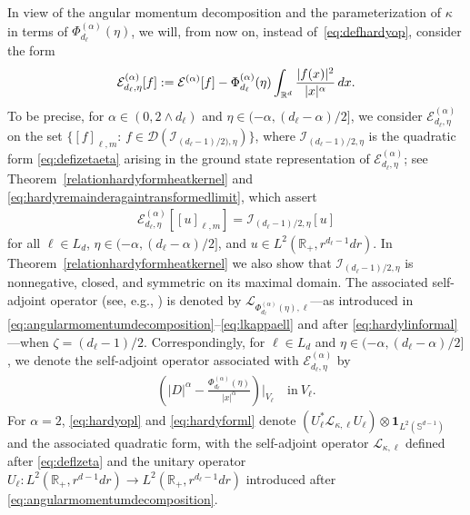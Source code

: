 \documentclass[12pt,reqno]{amsart}
\theoremstyle{definition}
\theoremstyle{remark}
\numberwithin{equation}{section}
\newcommand{\1}{\mathbbm{1}}
\newcommand{\D}{\mathcal{D}}
\newcommand{\R}{\mathbb{R}}
\def\bs{\mathbb{S}}
\def\ce{\mathcal{E}}
\def\ci{\mathcal{I}}
\def\cl{\mathcal{L}}
\newcommand{\one}{\mathbf{1}}
\begin{document}
\smallskip
In view of the angular momentum decomposition and the parameterization of $\kappa$ in terms of $\Phi_{d_\ell}^{(\alpha)}(\eta)$, we will, from now on, instead of~\eqref{eq:defhardyop}, consider the form
\begin{align}
  \label{eq:hardyforml}
  \begin{split}
    \ce_{d_\ell,\eta}^{(\alpha)}[f]\index{$\ce_{d_\ell,\eta}^{(\alpha)}$}
    := \ce^{(\alpha)}[f] - \Phi_{d_\ell}^{(\alpha)}(\eta) \int_{\R^d}\frac{|f(x)|^2}{|x|^\alpha}\,dx.
  \end{split}
\end{align}
To be precise, for $\alpha\in(0,2\wedge d_\ell)$ and $\eta\in(-\alpha,(d_\ell-\alpha)/2]$, we consider $\ce_{d_\ell,\eta}^{(\alpha)}$ on the set $\{[f]_{\ell,m}:\, f\in \D(\ci_{(d_\ell-1)/2),\eta})\}$, where $\ci_{(d_\ell-1)/2,\eta}$ is the quadratic form \eqref{eq:defizetaeta} arising in the ground state representation of $\ce_{d_\ell,\eta}^{(\alpha)}$; see Theorem~\ref{relationhardyformheatkernel} and \eqref{eq:hardyremainderagaintransformedlimit}, which assert
\begin{align}
  \label{eq:hardyl}
  \ce_{d_\ell,\eta}^{(\alpha)}[[u]_{\ell,m}] = \ci_{(d_\ell-1)/2,\eta}[u]
\end{align}
for all $\ell\in L_d$, 
$\eta\in(-\alpha,(d_\ell-\alpha)/2]$, and 
$u\in L^2(\R_+,r^{d_\ell-1}dr)$. %
In Theorem~\ref{relationhardyformheatkernel} we also show that $\ci_{(d_\ell-1)/2,\eta}$ is nonnegative, closed, and symmetric on its maximal domain. The associated self-adjoint operator (see, e.g., \cite[Theorem~1.3.1]{Fukushimaetal2011}) is denoted by $\cl_{\Phi_{d_\ell}^{(\alpha)}(\eta),\ell}$---as introduced in \eqref{eq:angularmomentumdecomposition}--\eqref{eq:lkappaell} and after \eqref{eq:hardylinformal}---when $\zeta=(d_\ell-1)/2$. Correspondingly, for $\ell\in L_d$ and $\eta\in(-\alpha,(d_\ell-\alpha)/2]$, we denote the self-adjoint operator associated with $\ce_{d_\ell,\eta}^{(\alpha)}$ by
\begin{align}
  \label{eq:hardyopl}
  \left(|D|^\alpha-\frac{\Phi_{d_\ell}^{(\alpha)}(\eta)}{|x|^\alpha}\right)\big|_{V_\ell} \quad \text{in} \ V_\ell.
\end{align}
For $\alpha=2$, \eqref{eq:hardyopl} and \eqref{eq:hardyforml} denote $(U_\ell^*\cl_{\kappa,\ell} U_\ell)\otimes\one_{L^2(\bs^{d-1})}$ and the associated quadratic form, with the self-adjoint operator $\cl_{\kappa,\ell}$ defined after \eqref{eq:deflzeta} and the unitary operator $U_\ell:L^2(\R_+,r^{d-1}dr)\to L^2(\R_+,r^{d_\ell-1}dr)$ introduced after \eqref{eq:angularmomentumdecomposition}.
\end{document}
